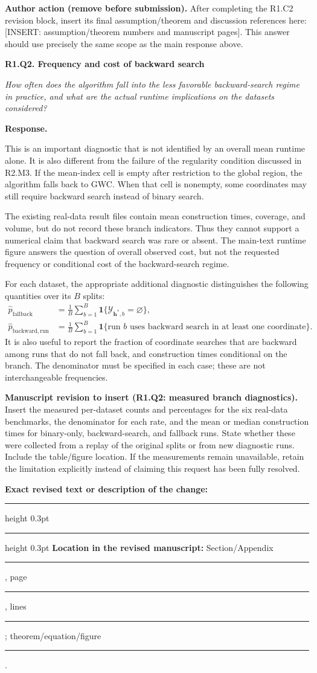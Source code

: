 \documentclass[11pt]{article}
\numberwithin{equation}{section}
\newcommand{\ind}{\mathbf{1}}
\newcommand{\pending}[1]{\textcolor{AuthorRed}{[INSERT: #1]}}
\newcommand{\authoraction}[1]{%
  \par\begingroup\small\color{AuthorRed}%
  \textbf{Author action (remove before submission).} #1\par\endgroup}
\newcommand{\reviewercomment}[2]{%
  \par\medskip\noindent\textbf{#1}\par\nopagebreak
  \begingroup\color{ReviewerBlue}\itshape #2\par\endgroup
  \noindent\textbf{Response.} }
\newcommand{\revisionblock}[2]{%
  \par\begingroup\color{AuthorRed}\small
  \textbf{Manuscript revision to insert (#1).} #2\par
  \textbf{Exact revised text or description of the change:}\par
  \vspace{0.35em}\hrule height 0.3pt\vspace{1.4em}
  \hrule height 0.3pt\vspace{0.6em}
  \textbf{Location in the revised manuscript:}
  Section/Appendix \rule{1.3cm}{0.3pt},
  page \rule{1cm}{0.3pt},
  lines \rule{1.3cm}{0.3pt};
  theorem/equation/figure \rule{1.4cm}{0.3pt}.
  \par\endgroup}
\begin{document}
\authoraction{After completing the R1.C2 revision block, insert its
final assumption/theorem and discussion references here:
\pending{assumption/theorem numbers and manuscript pages}. This answer
should use precisely the same scope as the main response above.}

\reviewercomment{R1.Q2. Frequency and cost of backward search}{%
How often does the algorithm fall into the less favorable
backward-search regime in practice, and what are the actual runtime
implications on the datasets considered?}

This is an important diagnostic that is not identified by an overall
mean runtime alone. It is also different from the failure of the
regularity condition discussed in R2.M3. If the mean-index cell is
empty after restriction to the global region, the algorithm falls back
to GWC. When that cell is nonempty, some coordinates may still require
backward search instead of binary search.

The existing real-data result files contain mean construction times,
coverage, and volume, but do not record these branch indicators. Thus
they cannot support a numerical claim that backward search was rare
or absent. The main-text runtime figure answers the question of overall
observed cost, but not the requested frequency or conditional cost of
the backward-search regime.

For each dataset, the appropriate additional diagnostic distinguishes
the following quantities over its $B$ splits:
\begin{align}
  \widehat p_{\mathrm{fallback}}
  &=\frac{1}{B}\sum_{b=1}^{B}
    \ind\{\mathcal Y_{\bm h^*,b}=\varnothing\},\\
  \widehat p_{\mathrm{backward,run}}
  &=\frac{1}{B}\sum_{b=1}^{B}
    \ind\{\text{run $b$ uses backward search in at least one coordinate}\}.
\end{align}
It is also useful to report the fraction of coordinate searches that
are backward among runs that do not fall back, and construction times
conditional on the branch. The denominator must be specified in each
case; these are not interchangeable frequencies.

\revisionblock{R1.Q2: measured branch diagnostics}{Insert the measured
per-dataset counts and percentages for the six real-data benchmarks,
the denominator for each rate, and the mean or median construction
times for binary-only, backward-search, and fallback runs. State
whether these were collected from a replay of the original splits
or from new diagnostic runs. Include the table/figure location. If
the measurements remain unavailable, retain the limitation explicitly
instead of claiming this request has been fully resolved.}
\end{document}
